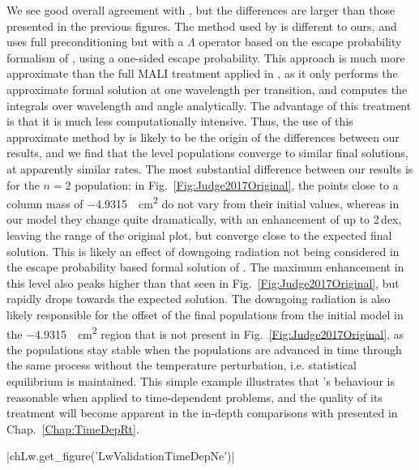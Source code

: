 We see good overall agreement with \citet{Judge2017}, but the differences are larger than those presented in the previous figures.
The method used by \citet{Judge2017} is different to ours, and uses full preconditioning but with a $\Lambda$ operator based on the escape probability formalism of \citet{Hummer1982}, using a one-sided escape probability.
This approach is much more approximate than the full MALI treatment applied in \Lw{}, as it only performs the approximate formal solution at one wavelength per transition, and computes the integrals over wavelength and angle analytically.
The advantage of this treatment is that it is much less computationally intensive.
Thus, the use of this approximate method by \citet{Judge2017} is likely to be the origin of the differences between our results, and we find that the level populations converge to similar final solutions, at apparently similar rates.
The most substantial difference between our results is for the $n=2$ population: in Fig.~\ref{Fig:Judge2017Original}, the points close to a column mass of \SI{-4.9315}{\per\square\centi\metre} do not vary from their initial values, whereas in our model they change quite dramatically, with an enhancement of up to 2\,dex, leaving the range of the original plot, but converge close to the expected final solution.
This is likely an effect of downgoing radiation not being considered in the escape probability based formal solution of \citet{Judge2017}.
The maximum enhancement in this level also peaks higher than that seen in Fig.~\ref{Fig:Judge2017Original}, but rapidly drops towards the expected solution.
The downgoing radiation is also likely responsible for the offset of the final populations from the initial model in the \SI{-4.9315}{\per\square\centi\m} region that is not present in Fig.~\ref{Fig:Judge2017Original}, as the populations stay stable when the populations are advanced in time through the same process without the temperature perturbation, i.e. statistical equilibrium is maintained.
This simple example illustrates that \Lw{}'s behaviour is reasonable when applied to time-dependent problems, and the quality of its treatment will become apparent in the in-depth comparisons with \Radyn{} presented in Chap.~\ref{Chap:TimeDepRt}.

\py[Lw]|chLw.get_figure('LwValidationTimeDepNe')|

